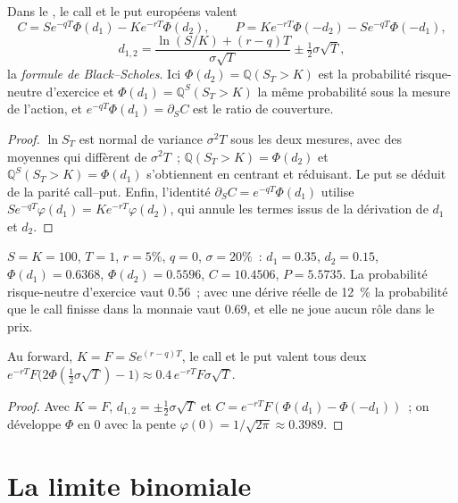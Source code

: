 \begin{theorem}\label{thm:dv:black-scholes-three-ways:formula}
Dans le , le call et le put européens valent
\[
C=Se^{-qT}\Phi(d_1)-Ke^{-rT}\Phi(d_2),\qquad
P=Ke^{-rT}\Phi(-d_2)-Se^{-qT}\Phi(-d_1),
\]
\[
d_{1,2}=\frac{\ln(S/K)+(r-q)T}{\sigma\sqrt T}\pm\tfrac12\sigma\sqrt T,
\]
la \emph{formule de Black--Scholes}. Ici
$\Phi(d_2)=\mathbb Q(S_T>K)$ est la probabilité risque-neutre d'exercice et
$\Phi(d_1)=\mathbb Q^S(S_T>K)$ la même probabilité sous la mesure de l'action, et
$e^{-qT}\Phi(d_1)=\partial_SC$ est le ratio de couverture.
\end{theorem}
\begin{proof}
$\ln S_T$ est normal de variance $\sigma^2T$ sous les deux mesures, avec des moyennes
qui diffèrent de $\sigma^2T$~; $\mathbb Q(S_T>K)=\Phi(d_2)$ et $\mathbb Q^S(S_T>K)=
\Phi(d_1)$ s'obtiennent en centrant et réduisant. Le put se déduit de la parité call--put. Enfin,
l'identité $\partial_SC=e^{-qT}\Phi(d_1)$ utilise $S e^{-qT}\varphi(d_1)=Ke^{-rT}
\varphi(d_2)$, qui annule les termes issus de la dérivation de $d_1$ et $d_2$.
\end{proof}

\begin{example}\label{ex:dv:black-scholes-three-ways:ref}
$S=K=100$, $T=1$, $r=5\%$, $q=0$, $\sigma=20\%$~: $d_1=0.35$, $d_2=0.15$,
$\Phi(d_1)=0.6368$, $\Phi(d_2)=0.5596$, $C=10.4506$, $P=5.5735$. La probabilité risque-neutre
d'exercice vaut 0.56~; avec une dérive réelle de 12~\% la
probabilité que le call finisse dans la monnaie vaut 0.69, et elle ne joue aucun rôle dans le
prix.
\end{example}

\begin{proposition}\label{prop:dv:black-scholes-three-ways:atm}
Au forward, $K=F=Se^{(r-q)T}$, le call et le put valent tous deux
$e^{-rT}F\bigl(2\Phi(\tfrac12\sigma\sqrt T)-1\bigr)\approx0.4\,e^{-rT}F\sigma\sqrt T$.
\end{proposition}
\begin{proof}
Avec $K=F$, $d_{1,2}=\pm\tfrac12\sigma\sqrt T$ et $C=e^{-rT}F(\Phi(d_1)-\Phi(-d_1))$~;
on développe $\Phi$ en 0 avec la pente $\varphi(0)=1/\sqrt{2\pi}\approx0.3989$.
\end{proof}

\section{La limite binomiale}

